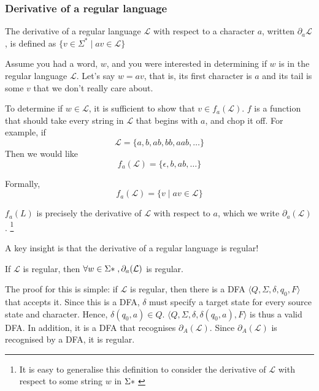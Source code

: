 \subsubsection{Derivative of a regular language}
\vspace{3mm}

\begin{definition}
    The derivative of a regular language $\mathcal{L}$ with respect to a character $a$, written $\partial_a \mathcal{L}$, is defined as $\{v \in \Sigma^{*} \mid av \in \mathcal{L} \}$
\end{definition}

Assume you had a word, $w$, and you were interested in determining if $w$ is in the regular language $\mathcal{L}$. Let's say $w = av$, that is, its first character is $a$ and its tail is some $v$ that we don't really care about.

To determine if $w \in \mathcal{L}$, it is sufficient to show that $v \in f_a(\mathcal{L})$. $f$ is a function that should take every string in $\mathcal{L}$ that begins with $a$, and chop it off. For example, if \[\mathcal{L} = \{ a, b, ab, bb, aab, \ldots \}\] Then we would like \[f_a(\mathcal{L}) = \{ \epsilon, b, ab, \ldots\} \]

Formally, \[f_a(\mathcal{L}) = \{ v \mid av \in \mathcal{L}\}\]

$f_a(L)$ is precisely the derivative of $\mathcal{L}$ with respect to $a$, which we write $\partial_a(\mathcal{L})$. \footnote{It is easy to generalise this definition to consider the derivative of $\mathcal{L}$ with respect to some string $w$ in $\Sigma\*$}

A key insight is that the derivative of a regular language is regular!

\begin{theorem}
    \label{thm:closure-differentiation}
    If $\mathcal{L}$ is regular, then $\forall w \in \Sigma\*, \partial_a(\mathcal{L})$ is regular.
\end{theorem}

The proof for this is simple: if $\mathcal{L}$ is regular, then there is a DFA $\langle Q, \Sigma, \delta, q_0, F \rangle$ that accepts it. Since this is a DFA, $\delta$ must specify a target state for every source state and character. Hence, $\delta(q_0, a) \in Q$. $\langle Q, \Sigma, \delta, \delta(q_0, a), F \rangle$ is thus a valid DFA. In addition, it is a DFA that recognises $\partial_A(\mathcal{L})$. Since $\partial_A(\mathcal{L})$ is recognised by a DFA, it is regular.

